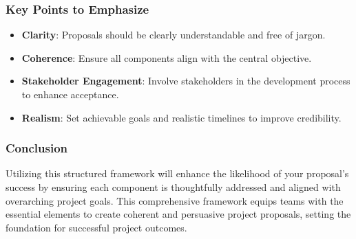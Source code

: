 \documentclass[aspectratio=169]{beamer}
\begin{document}
\begin{frame}[fragile]
    \frametitle{Key Points to Emphasize}
    \begin{itemize}
        \item \textbf{Clarity}: Proposals should be clearly understandable and free of jargon.
        \item \textbf{Coherence}: Ensure all components align with the central objective.
        \item \textbf{Stakeholder Engagement}: Involve stakeholders in the development process to enhance acceptance.
        \item \textbf{Realism}: Set achievable goals and realistic timelines to improve credibility.
    \end{itemize}
\end{frame}

\begin{frame}[fragile]
    \frametitle{Conclusion}
    Utilizing this structured framework will enhance the likelihood of your proposal's success by ensuring each component is thoughtfully addressed and aligned with overarching project goals. This comprehensive framework equips teams with the essential elements to create coherent and persuasive project proposals, setting the foundation for successful project outcomes.
\end{frame}
\end{document}
